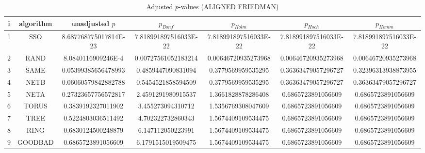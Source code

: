 \documentclass[a4paper,10pt]{article}
\begin{document}
\begin{landscape}
\begin{table}[!htp]
\centering\scriptsize
\caption{Adjusted $p$-values (ALIGNED FRIEDMAN)}
\begin{tabular}{ccccccc}
i&algorithm&unadjusted $p$&$p_{Bonf}$&$p_{Holm}$&$p_{Hoch}$&$p_{Homm}$\\
\hline
1& SSO&8.687768775017814E-23&7.818991897516033E-22&7.818991897516033E-22&7.818991897516033E-22&7.818991897516033E-22\\
2& RAND&8.0840116909246E-4&0.00727561052183214&0.00646720935273968&0.00646720935273968&0.00646720935273968\\
3& SAME&0.05399385656478993&0.4859447090831094&0.3779569959535295&0.36363479057296727&0.32396313938873955\\
4& NETB&0.06060579842882788&0.5454521858594509&0.3779569959535295&0.36363479057296727&0.36363479057296727\\
5& NETA&0.27323657756572817&2.4591291980915537&1.3661828878286408&0.6865723891056609&0.6865723891056609\\
6& TORUS&0.3839192327011902&3.455273094310712&1.5356769308047609&0.6865723891056609&0.6865723891056609\\
7& TREE&0.5224803036511492&4.702322732860343&1.5674409109534475&0.6865723891056609&0.6865723891056609\\
8& RING&0.6830124500248879&6.147112050223991&1.5674409109534475&0.6865723891056609&0.6865723891056609\\
9& GOODBAD&0.6865723891056609&6.1791515019509475&1.5674409109534475&0.6865723891056609&0.6865723891056609\\
\hline
\end{tabular}
\end{table}


\end{landscape}
\end{document}
